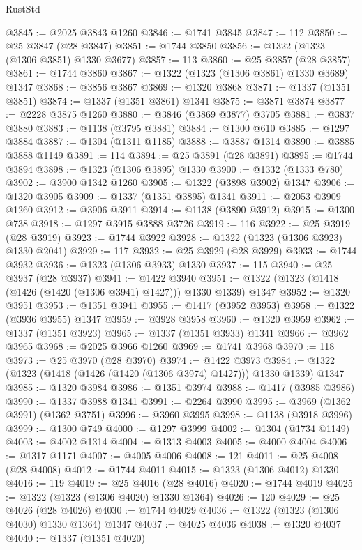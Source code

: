 \begin{lexlean}{RustStd}
\begin{coremodule}
@3845 := @2025 @3843 @1260
@3846 := @1741 @3845
@3847 := 112
@3850 := @25 @3847 (@28 @3847)
@3851 := @1744 @3850
@3856 := @1322 (@1323 (@1306 @3851) @1330 @3677)
@3857 := 113
@3860 := @25 @3857 (@28 @3857)
@3861 := @1744 @3860
@3867 := @1322 (@1323 (@1306 @3861) @1330 @3689) @1347
@3868 := @3856 @3867
@3869 := @1320 @3868
@3871 := @1337 (@1351 @3851)
@3874 := @1337 (@1351 @3861) @1341
@3875 := @3871 @3874
@3877 := @2228 @3875 @1260
@3880 := @3846 (@3869 @3877) @3705
@3881 := @3837 @3880
@3883 := @1138 (@3795 @3881)
@3884 := @1300 @610
@3885 := @1297 @3884
@3887 := @1304 (@1311 @1185)
@3888 := @3887 @1314
@3890 := @3885 @3888 @1149
@3891 := 114
@3894 := @25 @3891 (@28 @3891)
@3895 := @1744 @3894
@3898 := @1323 (@1306 @3895) @1330
@3900 := @1332 (@1333 @780)
@3902 := @3900 @1342 @1260
@3905 := @1322 (@3898 @3902) @1347
@3906 := @1320 @3905
@3909 := @1337 (@1351 @3895) @1341
@3911 := @2053 @3909 @1260
@3912 := @3906 @3911
@3914 := @1138 (@3890 @3912)
@3915 := @1300 @738
@3918 := @1297 @3915 @3888 @3726
@3919 := 116
@3922 := @25 @3919 (@28 @3919)
@3923 := @1744 @3922
@3928 := @1322 (@1323 (@1306 @3923) @1330 @2041)
@3929 := 117
@3932 := @25 @3929 (@28 @3929)
@3933 := @1744 @3932
@3936 := @1323 (@1306 @3933) @1330
@3937 := 115
@3940 := @25 @3937 (@28 @3937)
@3941 := @1422 @3940
@3951 := @1322 (@1323 (@1418 (@1426 (@1420 (@1306 @3941) @1427))) @1330 @1339) @1347
@3952 := @1320 @3951
@3953 := @1351 @3941
@3955 := @1417 (@3952 @3953)
@3958 := @1322 (@3936 @3955) @1347
@3959 := @3928 @3958
@3960 := @1320 @3959
@3962 := @1337 (@1351 @3923)
@3965 := @1337 (@1351 @3933) @1341
@3966 := @3962 @3965
@3968 := @2025 @3966 @1260
@3969 := @1741 @3968
@3970 := 118
@3973 := @25 @3970 (@28 @3970)
@3974 := @1422 @3973
@3984 := @1322 (@1323 (@1418 (@1426 (@1420 (@1306 @3974) @1427))) @1330 @1339) @1347
@3985 := @1320 @3984
@3986 := @1351 @3974
@3988 := @1417 (@3985 @3986)
@3990 := @1337 @3988 @1341
@3991 := @2264 @3990
@3995 := @3969 (@1362 @3991) (@1362 @3751)
@3996 := @3960 @3995
@3998 := @1138 (@3918 @3996)
@3999 := @1300 @749
@4000 := @1297 @3999
@4002 := @1304 (@1734 @1149)
@4003 := @4002 @1314
@4004 := @1313 @4003
@4005 := @4000 @4004
@4006 := @1317 @1171
@4007 := @4005 @4006
@4008 := 121
@4011 := @25 @4008 (@28 @4008)
@4012 := @1744 @4011
@4015 := @1323 (@1306 @4012) @1330
@4016 := 119
@4019 := @25 @4016 (@28 @4016)
@4020 := @1744 @4019
@4025 := @1322 (@1323 (@1306 @4020) @1330 @1364)
@4026 := 120
@4029 := @25 @4026 (@28 @4026)
@4030 := @1744 @4029
@4036 := @1322 (@1323 (@1306 @4030) @1330 @1364) @1347
@4037 := @4025 @4036
@4038 := @1320 @4037
@4040 := @1337 (@1351 @4020)

\end{coremodule}
\end{lexlean}
